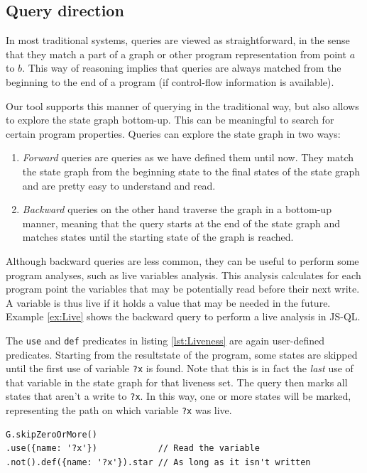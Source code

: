 \subsection{Query direction}

In most traditional systems, queries are viewed as straightforward, in the sense that they match a part of a graph or other program representation from point $a$ to $b$. This way of reasoning implies that queries are always matched from the beginning to the end of a program (if control-flow information is available). 

Our tool supports this manner of querying in the traditional way, but also allows to explore the state graph bottom-up. This can be meaningful to search for certain program properties. Queries can explore the state graph in two ways:
\begin{enumerate}
\item \textit{Forward} queries are queries as we have defined them until now. They match the state graph from the beginning state to the final states of the state graph and are pretty easy to understand and read. 
\item \textit{Backward} queries on the other hand traverse the graph in a bottom-up manner, meaning that the query starts at the end of the state graph and matches states until the starting state of the graph is reached. 
\end{enumerate}

 Although backward queries are less common, they can be useful to perform some program analyses, such as live variables analysis. This analysis calculates for each program point the variables that may be potentially read before their next write. A variable is thus live if it holds a value that may be needed in the future. Example \ref{ex:Live} shows the backward query to perform a live analysis in JS-QL.

 \begin{exmp}
 \label{ex:Live}

 The \texttt{use} and \texttt{def} predicates in listing \ref{lst:Liveness} are again user-defined predicates. Starting from the resultstate of the program, some states are skipped until the first use of variable \texttt{?x} is found. Note that this is in fact the \textit{last} use of that variable in the state graph for that liveness set. The query then marks all states that aren't a write to \texttt{?x}. In this way, one or more states will be marked, representing the path on which variable \texttt{?x} was live.
\begin{lstlisting}[label={lst:Liveness},language=JSQL, caption=Live variables anlysis in JS-QL,mathescape=true]
G.skipZeroOrMore()
.use({name: '?x'})            // Read the variable 
.not().def({name: '?x'}).star // As long as it isn't written
\end{lstlisting}
\end{exmp}


